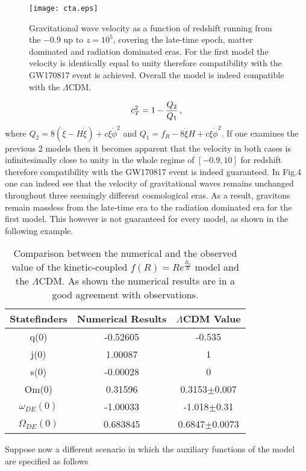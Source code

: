 \documentclass[aps,prd,twocolumn,groupedaddress,showpacs,nofootinbib,amssymb]{revtex4-2}
\begin{document}
\begin{figure}[h!]
\centering
\label{plot4}
\texttt{[image: cta.eps]}
\caption{Gravitational wave velocity as a function of redshift running from the $-0.9$ up to $z=10^5$, covering the late-time epoch, matter dominated and radiation dominated eras. For the first model the velocity is identically equal to unity therefore compatibility with the GW170817 event is achieved. Overall the model is indeed compatible with the $\Lambda$CDM.}
\end{figure}

\begin{equation}
\centering
\label{cT}
c_T^2=1-\frac{Q_2}{Q_1}\, ,
\end{equation}
where $Q_2=8(\ddot\xi-H\dot\xi)+c\xi\dot\phi^2$ and $Q_1=f_R-8\dot\xi H+c\xi\dot\phi^2$. If one examines the previous 2 models then it becomes apparent that the velocity in both cases is infinitesimally close to unity in the whole regime of $[-0.9,10]$ for redshift therefore compatibility with the GW170817 event is indeed guaranteed. In Fig.4 one can indeed see that the velocity of gravitational waves remains unchanged throughout three seemingly different cosmological eras. As a result, gravitons remain massless from the late-time era to the radiation dominated era for the first model. This however is not guaranteed for every model, as shown in the following example.

\begin{table}
\centering
\begin{tabular}{|c|c|c|}\hline
Statefinders&Numerical Results& $\Lambda$CDM Value\\ \hline
q(0)&-0.52605&-0.535\\ \hline
j(0)&1.00087&1\\ \hline
s(0)&-0.00028&0\\ \hline
Om(0)&0.31596&0.3153$\pm$0.007\\ \hline
$\omega_{DE}(0)$&-1.00033&-1.018$\pm$0.31\\ \hline
$\Omega_{DE}(0)$&0.683845&0.6847$\pm0.0073$\\ \hline
\end{tabular}
\caption{Comparison between the numerical and the observed value of the kinetic-coupled $f(R)=R e^{\frac{R_0}{R}}$ model and the $\Lambda$CDM. As shown the numerical results are in a good agreement with observations.}
\end{table}


Suppose now a different scenario in which the auxiliary functions of the model are specified as follows
\end{document}
